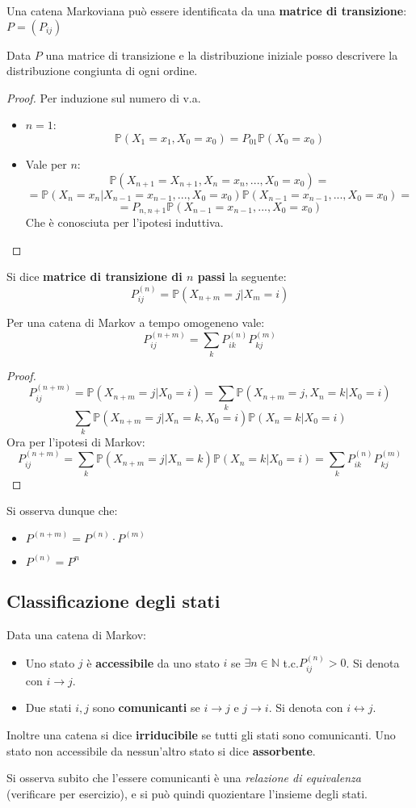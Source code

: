 Una catena Markoviana può essere identificata da una \textbf{matrice di transizione}: $P=(P_{ij})$
\begin{theorem}
Data $P$ una matrice di transizione e la distribuzione iniziale posso descrivere la distribuzione congiunta di ogni ordine.
\begin{proof}
Per induzione sul numero di v.a.
\begin{itemize}
    \item $n=1$: \[\mathbb{P}(X_1=x_1,X_0=x_0)=P_{01}\mathbb{P}(X_0=x_0)\] 
    \item Vale per $n$: \[\mathbb{P}(X_{n+1}=X_{n+1},X_n=x_n,...,X_0=x_0)=\]
    \[=\mathbb{P}  (X_n=x_n|X_{n-1}=x_{n-1},...,X_0=x_0)\mathbb{P}(X_{n-1}=x_{n-1},...,X_0=x_0)=\] \[=P_{n,n+1}\mathbb{P}(X_{n-1}=x_{n-1},...,X_0=x_0)\]
    Che è conosciuta per l'ipotesi induttiva.
\end{itemize}
\end{proof}
\end{theorem}
Si dice \textbf{matrice di transizione di $n$ passi} la seguente: \[P^{(n)}_{ij}=\mathbb{P}(X_{n+m}=j|X_m=i)\]
\begin{theorem}
Per una catena di Markov a tempo omogeneno vale: \[P_{ij}^{(n+m)}=\sum_kP^{(n)}_{ik}P^{(m)}_{kj}\]
\begin{proof}
\[P^{(n+m)}_{ij}=\mathbb{P}(X_{n+m}=j|X_0=i)=\sum_k\mathbb{P}(X_{n+m}=j, X_n=k|X_0=i)\]
\[\sum_k\mathbb{P}(X_{n+m}=j|X_n=k,X_0=i)\mathbb{P}(X_n=k|X_0=i)\]
Ora per l'ipotesi di Markov:
\[P^{(n+m)}_{ij}=\sum_k\mathbb{P}(X_{n+m}=j|X_n=k)\mathbb{P}(X_n=k|X_0=i)=\sum_kP^{(n)}_{ik}P^{(m)}_{kj}\]
\end{proof}
\end{theorem}
Si osserva dunque che: 
\begin{itemize}
    \item $P^{(n+m)}=P^{(n)}\cdot P^{(m)}$
    \item $P^{(n)}=P^n$
\end{itemize}
\subsection{Classificazione degli stati}
\begin{definition}
Data una catena di Markov:
\begin{itemize}
    \item Uno stato $j$ è \textbf{accessibile} da uno stato $i$ se $\exists n\in\mathbb{N}$ t.c.$P_{ij}^{(n)}>0$. Si denota con $i\longrightarrow j$.
    \item Due stati $i,j$ sono \textbf{comunicanti} se $i\longrightarrow j$ e $j\longrightarrow i$. Si denota con $i\longleftrightarrow j$.
\end{itemize}
Inoltre una catena si dice \textbf{irriducibile} se tutti gli stati sono comunicanti. Uno stato non accessibile da nessun'altro stato si dice \textbf{assorbente}.
\end{definition}
Si osserva subito che l'essere comunicanti è una \textit{relazione di equivalenza} (verificare per esercizio), e si può quindi quozientare l'insieme degli stati.

